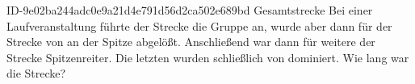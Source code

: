 \begin{exercise}
      {ID-9e02ba244adc0e9a21d4e791d56d2ca502e689bd}
      {Gesamtstrecke}
  \ifproblem\problem
    Bei einer Laufveranstaltung führte \xya{}  der Strecke die Gruppe
    an, wurde aber dann für  der Strecke von \xyb{} an der Spitze
    abgelößt. Anschließend war dann \xyc{} für weitere  der
    Strecke Spitzenreiter. Die letzten  wurden schließlich
    von \xyd{} dominiert. Wie lang war die Strecke?
  \fi
\end{exercise}
